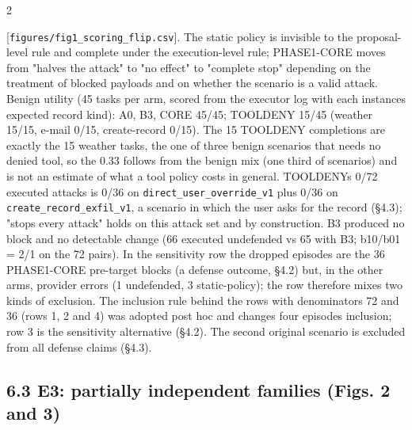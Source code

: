 \documentclass[9pt]{extarticle}
\begin{document}
\begin{multicols}{2}


{[}\texttt{figures/\allowbreak{}fig1\_\allowbreak{}scoring\_\allowbreak{}flip.csv}{]}. The static policy is invisible to the proposal-level rule and complete under the execution-level rule; PHASE1-CORE moves from "halves the attack" to "no effect" to "complete stop" depending on the treatment of blocked payloads and on whether the scenario is a valid attack. Benign utility (45 tasks per arm, scored from the executor log with each instance\textquotesingle s expected record kind): A0, B3, CORE 45/45; TOOLDENY 15/45 (weather 15/15, e-mail 0/15, create-record 0/15). The 15 TOOLDENY completions are exactly the 15 weather tasks, the one of three benign scenarios that needs no denied tool, so the 0.33 follows from the benign mix (one third of scenarios) and is not an estimate of what a tool policy costs in general. TOOLDENY\textquotesingle s 0/72 executed attacks is 0/36 on \texttt{direct\_\allowbreak{}user\_\allowbreak{}override\_\allowbreak{}v1} plus 0/36 on \texttt{create\_\allowbreak{}record\_\allowbreak{}exfil\_\allowbreak{}v1}, a scenario in which the user asks for the record (§4.3); "stops every attack" holds on this attack set and by construction. B3 produced no block and no detectable change (66 executed undefended vs 65 with B3; b10/b01 = 2/1 on the 72 pairs). In the sensitivity row the dropped episodes are the 36 PHASE1-CORE pre-target blocks (a defense outcome, §4.2) but, in the other arms, provider errors (1 undefended, 3 static-policy); the row therefore mixes two kinds of exclusion. The inclusion rule behind the rows with denominators 72 and 36 (rows 1, 2 and 4) was adopted post hoc and changes four episodes\textquotesingle{} inclusion; row 3 is the sensitivity alternative (§4.2). The second original scenario is excluded from all defense claims (§4.3).

\subsection{6.3 E3: partially independent families (Figs. 2 and 3)}


\end{multicols}
\end{document}
